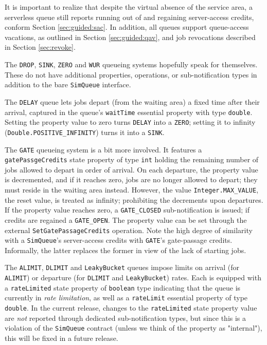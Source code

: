 It is important to realize that despite the virtual
  absence of the service area,
  a serverless queue still reports
  running out of and regaining
  server-access credits,
  conform Section \ref{sec:guided:sac}.
In addition,
  all queues support queue-access vacations,
  as outlined in Section \ref{sec:guided:qav},
  and job revocations
  described in Section \ref{sec:revoke}.
  
The \lstinline|DROP|,
  \lstinline|SINK|,
  \lstinline|ZERO|
  and \lstinline|WUR|
  queueing systems
  hopefully
  speak for themselves.
These do not have additional properties,
  operations, or sub-notification types
  in addition to the bare \lstinline|SimQueue|
  interface.

The \lstinline|DELAY| queue
  lets jobs depart (from the waiting area)
  a fixed time after their arrival,
  captured in the queue's
  \lstinline|waitTime|
  essential property
  with type \lstinline|double|.
Setting the property value to zero
  turns \lstinline|DELAY| into
  a \lstinline|ZERO|;
  setting it to infinity
  (\lstinline|Double.POSITIVE_INFINITY|)
  turns it into a \lstinline|SINK|.
  
The \lstinline|GATE| queueing system is a bit
  more involved.
It features a \lstinline|gatePassgeCredits|
  state property of type \lstinline|int|
  holding the remaining number of jobs
  allowed to depart
  in order of arrival.
On each departure,
  the property value is decremented,
  and if it reaches zero,
  jobs are no longer allowed to depart;
  they must reside in the waiting area instead.
However,
  the value \lstinline|Integer.MAX_VALUE|,
  the reset value,
  is treated as infinity;
  prohibiting the decrements upon departures.
If the property value reaches zero,
  a \lstinline|GATE_CLOSED| sub-notification
  is issued;
  if credits are regained a \lstinline|GATE_OPEN|.
The property value can be set through the
  external \lstinline|SetGatePassageCredits|
  operation.
Note the high degree of similarity
  with a \lstinline|SimQueue|'s
  server-access credits
  with \lstinline|GATE|'s
  gate-passage credits.
Informally,
  the latter replaces the former
  in view of the lack of starting jobs.
  
The \lstinline|ALIMIT|,
  \lstinline|DLIMIT|
  and \lstinline|LeakyBucket| queues
  impose limits on arrival (for \lstinline|ALIMIT|)
  or departure (for \lstinline|DLIMIT|
  and \lstinline|LeakyBucket|) rates.
Each is equipped
  with a \lstinline|rateLimited|
  state property of \lstinline|boolean|
  type indicating that
  the queue is currently in
  {\em rate limitation},
  as well as a \lstinline|rateLimit|
  essential property of type
  \lstinline|double|.
In the current release,
  changes to the \lstinline|rateLimited|
  state property value are
  {\em not\/} reported through
  dedicated sub-notification types,
  but since this is a violation
  of the \lstinline|SimQueue| contract
  (unless we think of the property as "internal"),
  this will be fixed in a future release.

